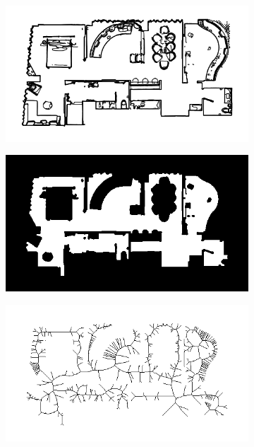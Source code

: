 \begin{figure}[h!]
	\centering
	\begin{subfigure}[b]{0.49\linewidth}
		\centering
		\includegraphics[width=\textwidth]{images/pose_estimator_1.png}
		\caption{}
		\label{fig:pose_estimator_1}
	\end{subfigure}
	\hfil
	\begin{subfigure}[b]{0.49\linewidth}
		\centering
		\includegraphics[width=\textwidth]{images/pose_estimator_filled_contours.png}
		\caption{}
		\label{fig:pose_estimator_filled}
	\end{subfigure}
	\newline
	\begin{subfigure}[b]{0.49\linewidth}
		\centering
		\includegraphics[width=\textwidth]{images/pose_estimator_bitmap_voronoi.png}

\end{subfigure}
\end{figure}
